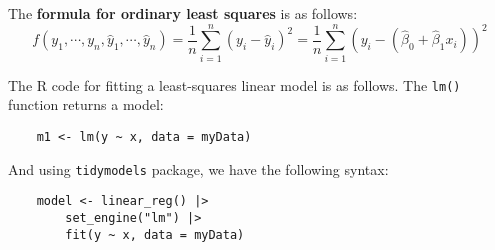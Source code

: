 \documentclass[titlepage, 12pt, leqno]{article}
\begin{document}
The \textbf{formula for ordinary least squares} is as follows:
\[
    f(y_1, \cdots ,y_n, \hat{y}_1, \cdots , \hat{y}_n) = \frac{1}{n} \sum_{i=1}^{n}\left(y_i - \hat{y}_i\right)^2 = \boxed{\frac{1}{n} \sum_{i=1}^{n}\left(y_i - \left(\hat{\beta}_0 + \hat{\beta}_1x_i\right)\right)^2}
\]

The R code for fitting a least-squares linear model is as follows. The \texttt{lm()} function returns a model:  
\begin{verbatim}
    m1 <- lm(y ~ x, data = myData)
\end{verbatim}

And using \texttt{tidymodels} package, we have the following syntax:
\begin{verbatim}
    model <- linear_reg() |>
        set_engine("lm") |>
        fit(y ~ x, data = myData)
\end{verbatim}
\end{document}
